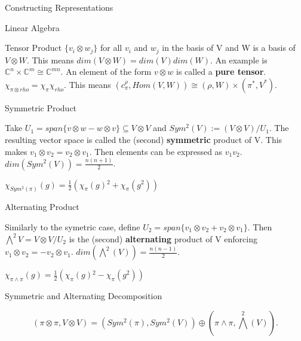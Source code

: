 \documentclass[12pt, letterpaper]{article}
\newcommand{\C}{\mathbb{C}}
\begin{document}
\begin{section}{Constructing Representations}
\begin{subsection}{Linear Algebra}
\begin{subsubsection}{Tensor Product}
      \(\{v_{i} \otimes w_{j} \}\) for all \(v_{i}\) and \(w_{j}\) in the basis
      of V and W is a basis of \(V \otimes W\). This means \(dim(V \otimes W) =
      dim(V)dim(W)\). An example is \(\C^{n} \times \C^{m} \cong \C^{mn}\). An
      element of the form \(v \otimes w\) is called a \textbf{pure tensor}.
      \(\chi_{\pi \otimes rho} = \chi_{\pi} \chi_{rho}\). This means
      \((c^{\rho}_{\pi}, Hom(V, W)) \cong (\rho, W) \times (\pi^{*}, V^{*})\).

    \end{subsubsection}

    \begin{subsubsection}{Symmetric Product}

      Take \(U_{1} = span \{v \otimes w - w \otimes v\} \subseteq V \otimes V\)
      and \(Sym^{2}(V) := (V \otimes V) / U_{1}\). The resulting vector space is
      called the (second) \textbf{symmetric} product of V. This makes \(v_{1}
      \otimes v_{2} = v_{2} \otimes v_{1}\). Then elements can be expressed as
      \(v_{1}v_{2}\). \(dim(Sym^{2}(V)) = \frac{n(n + 1)}{2}\).

      \(\chi_{Sym^{2}(\pi)}(g) = \frac{1}{2} (\chi_{\pi}(g){}^{2} +
      \chi_{\pi}(g^{2}))\)

    \end{subsubsection}

    \begin{subsubsection}{Alternating Product}

      Similarly to the symetric case, define \(U_{2} = span \{v_{1} \otimes
      v_{2} + v_{2} \otimes v_{1}\}\). Then
      \(\bigwedge^{2} V = V \otimes V / U_{2}\) is the (second)
      \textbf{alternating} product of V enforcing
      \(v_{1} \otimes v_{2} = -v_{2} \otimes v_{1}\).
      \(dim(\bigwedge^{2}(V)) = \frac{n(n - 1)}{2}\).

      \(\chi_{\pi \wedge \pi}(g) = \frac{1}{2} (\chi_{\pi}(g){}^{2} -
      \chi_{\pi}(g^{2}))\)

    \end{subsubsection}

    \begin{subsubsection}{Symmetric and Alternating Decomposition}

      \[(\pi \otimes \pi, V \otimes V) = (Sym^{2}(\pi), Sym^{2}(V)) \oplus
        (\pi \wedge \pi, \bigwedge^{2}(V)).\]

    \end{subsubsection}

  \end{subsection}


\end{section}
\end{document}
